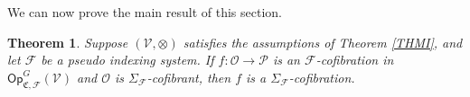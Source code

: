 \documentclass[a4paper,10pt
,draft
]{article}%
\numberwithin{equation}{section}
\numberwithin{figure}{section}
\newtheorem{theorem}[equation]{Theorem}%
\newtheorem{corollary}[equation]{Corollary}%
\theoremstyle{definition} %
\newcommand{\vect}[1]{\text{\overrightharp{\ensuremath{#1}}}}
\newcommand{\Op}{\mathsf{Op}}%
\DeclareMathOperator{\Aut}{Aut}%
\newcommand{\F}{\ensuremath{\mathcal F}}
\newcommand{\V}{\ensuremath{\mathcal V}}
\renewcommand{\O}{\ensuremath{\mathcal O}}
\renewcommand{\P}{\ensuremath{\mathcal P}}
\newcommand{\1}{\ensuremath{\mathbbm 1}}%
\begin{document}

We can now prove the main result of this section.

\begin{theorem}
      \label{SIGMAG_COF_THM}
      Suppose $(\V, \otimes)$ satisfies the assumptions of Theorem \ref{THMI},
      and let $\F$ be a pseudo indexing system.
      If $f \colon \O \to \P$ is an $\F$-cofibration in $\Op^G_{\mathfrak C, \F}(\V)$ and $\O$ is $\Sigma_\F$-cofibrant,
      then $f$ is a $\Sigma_\F$-cofibration.
\end{theorem}
\end{document}
